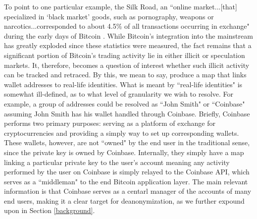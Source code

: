 \documentclass{article}
\begin{document}
To point to one particular example, the Silk Road, an ``online market...[that] specialized in `black market' goods, such as pornography, weapons or narcotics...corresponded to about 4.5\% of all transactions occurring in exchange" during the early days of Bitcoin \cite{silk}. While Bitcoin's integration into the mainstream has greatly exploded since these statistics were measured, the fact remains that a significant portion of Bitcoin's trading activity lie in either illicit or speculation markets. It, therefore, becomes a question of interest whether such illicit activity can be tracked and retraced. By this, we mean to say, produce a map that links wallet addresses to real-life identities. What is meant by ``real-life identities" is somewhat ill-defined, as to what level of granularity we wish to resolve. For example, a group of addresses could be resolved as ``John Smith" or ``Coinbase" assuming John Smith has his wallet handled through Coinbase. Briefly, Coinbase performs two primary purposes: serving as a platform of exchange for cryptocurrencies and providing a simply way to set up corresponding wallets. These wallets, however, are not ``owned" by the end user in the traditional sense, since the private key is owned by Coinbase. Internally, they simply have a map linking a particular private key to the user's account meaning any activity performed by the user on Coinbase is simply relayed to the Coinbase API, which serves as a ``middleman" to the end Bitcoin application layer. The main relevant information is that Coinbase serves as a centarl manager of the accounts of many end users, making it a clear target for deanonymization, as we further expound upon in Section \ref{background}.
\end{document}
